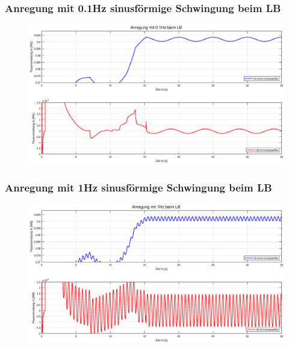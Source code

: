 \documentclass[serif,11pt, xcolor=table]{beamer}
\begin{document}
	\begin{frame}
		\frametitle{Anregung mit 0.1Hz sinusförmige Schwingung beim LB}
		
		\begin{figure}[htbp]
			\centering
			\includegraphics[scale=0.30]{Abbildungen/LB_01.eps}
			
		\end{figure}	
		
	\end{frame}
	\begin{frame}
		\frametitle{Anregung mit 1Hz sinusförmige Schwingung beim LB}
		
		\begin{figure}[htbp]
			\centering
			\includegraphics[scale=0.30]{Abbildungen/LB_1.eps}
			
		\end{figure}	
		
	\end{frame}
\end{document}
